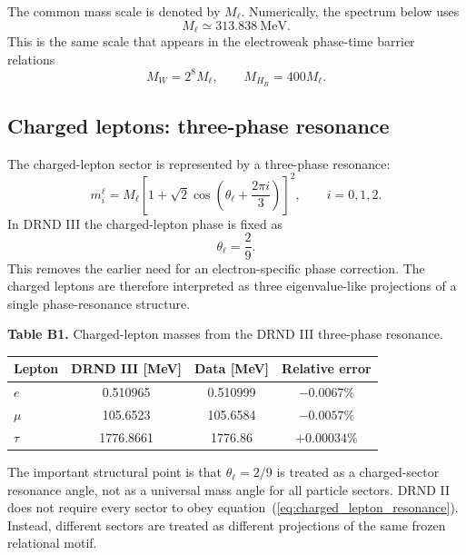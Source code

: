 \documentclass[12pt]{iopart}
\begin{document}
The common mass scale is denoted by \(M_\ell\). Numerically, the spectrum below uses
\begin{equation}
M_\ell\simeq 313.838~\mathrm{MeV}.
\end{equation}
This is the same scale that appears in the electroweak phase-time barrier relations
\begin{equation}
M_W=2^8M_\ell,
\qquad
M_{H_B}=400M_\ell.
\end{equation}

\subsection{Charged leptons: three-phase resonance}

The charged-lepton sector is represented by a three-phase resonance:
\begin{equation}
m_i^\ell
=
M_\ell
\left[
1+\sqrt{2}\cos\left(
\theta_\ell+\frac{2\pi i}{3}
\right)
\right]^2,
\qquad
i=0,1,2.
\label{eq:charged_lepton_resonance}
\end{equation}
In DRND III the charged-lepton phase is fixed as
\begin{equation}
\theta_\ell=\frac{2}{9}.
\label{eq:theta_lepton}
\end{equation}
This removes the earlier need for an electron-specific phase correction. The charged leptons are therefore interpreted as three eigenvalue-like projections of a single phase-resonance structure.

\noindent\textbf{Table B1.} Charged-lepton masses from the DRND III three-phase resonance.

\begin{center}
\small
\begin{tabular}{lccc}
\hline
\textbf{Lepton} & \textbf{DRND III [MeV]} & \textbf{Data [MeV]} & \textbf{Relative error} \\
\hline
\(e\)     & 0.510965  & 0.510999 & \(-0.0067\%\) \\
\(\mu\)  & 105.6523  & 105.6584 & \(-0.0057\%\) \\
\(\tau\) & 1776.8661 & 1776.86  & \(+0.00034\%\) \\
\hline
\end{tabular}
\end{center}

The important structural point is that \(\theta_\ell=2/9\) is treated as a charged-sector resonance angle, not as a universal mass angle for all particle sectors. DRND II does not require every sector to obey equation~(\ref{eq:charged_lepton_resonance}). Instead, different sectors are treated as different projections of the same frozen relational motif.
\end{document}
